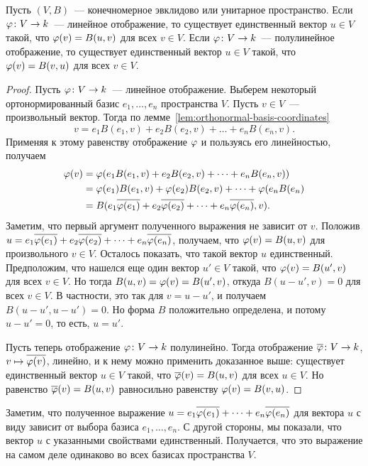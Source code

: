 \begin{theorem}\label{thm:Riesz_theorem}
Пусть $(V,B)$~--- конечномерное эвклидово или унитарное пространство.
Если $\varphi\colon V\to k$~--- линейное отображение, то существует
единственный вектор $u\in V$ такой, что $\varphi(v) = B(u,v)$ для всех $v\in V$.
Если $\varphi\colon V\to k$~--- полулинейное отображение, то существует
единственный вектор $u\in V$ такой, что $\varphi(v) = B(v,u)$ для всех $v\in V$.
\end{theorem}
\begin{proof}
Пусть $\varphi\colon V\to k$~--- линейное отображение.
Выберем некоторый ортонормированный базис $e_1,\dots,e_n$ пространства $V$.
Пусть $v\in V$~--- произвольный вектор.
Тогда по лемме~\ref{lem:orthonormal-basis-coordinates}
$$
v = e_1 B(e_1,v) + e_2 B(e_2,v) + \dots + e_n B(e_n,v).
$$
Применяя к этому равенству отображение $\varphi$ и пользуясь его линейностью, получаем
\begin{align*}
\varphi(v) &= \varphi(e_1 B(e_1,v) + e_2 B(e_2, v) + \dots + e_n B(e_n,v)) \\
&= \varphi(e_1)B(e_1,v) + \varphi(e_2)B(e_2,v) + \dots + \varphi(e_n B(e_n) \\
&= B(e_1\overline{\varphi(e_1)} + e_2\overline{\varphi(e_2)} + \dots + e_n\overline{\varphi(e_n)},v).
\end{align*}
Заметим, что первый аргумент полученного выражения не зависит от $v$.
Положив $u = e_1\overline{\varphi(e_1)} + e_2\overline{\varphi(e_2)} + \dots
+ e_n\overline{\varphi(e_n)}$, получаем,
что $\varphi(v) = B(u,v)$ для произвольного $v\in V$. Осталось показать, что такой
вектор $u$ единственный. Предположим, что нашелся еще один вектор $u'\in V$
такой, что $\varphi(v) = B(u',v)$ для всех $v\in V$.
Но тогда $B(u,v) = \varphi(v) = B(u',v)$, откуда $B(u-u',v) = 0$ для всех $v\in V$.
В частности, это так для $v = u-u'$, и получаем $B(u-u',u-u') = 0$.
Но форма $B$ положительно определена, и потому $u-u'=0$, то есть, $u=u'$.

Пусть теперь отображение $\varphi\colon V\to k$ полулинейно. Тогда
отображение $\overline{\varphi}\colon V\to k$, $v\mapsto \overline{\varphi(v)}$,
линейно, и к нему можно применить доказанное выше: существует единственный вектор
$u\in V$ такой, что $\overline{\varphi}(v) = B(u,v)$ для всех $u\in V$.
Но равенство $\overline{\varphi}(v) = B(u,v)$ равносильно равенству
$\varphi(v) = B(v,u)$.
\end{proof}

\begin{remark}
Заметим, что полученное выражение
$u = e_1\overline{\varphi(e_1)} + \dots + e_n\overline{\varphi(e_n)}$
для вектора $u$ с виду зависит от выбора базиса $e_1,\dots,e_n$.
С другой стороны, мы показали, что вектор $u$ с указанными свойствами
единственный. Получается, что это выражение на самом деле одинаково
во всех базисах пространства $V$.
\end{remark}

